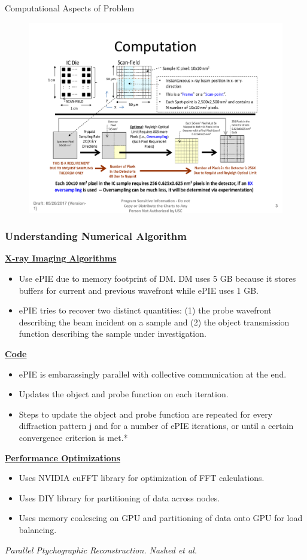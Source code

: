 \begin{frame}{Computational Aspects of Problem} 
\begin{figure}[ht!]
\includegraphics[scale=0.4]{./images/exp_schematic_1017_2}
\end{figure}
\end{frame}

\begin{frame}[label=AppUnderstanding]
\frametitle{Understanding Numerical Algorithm}
{\small \underline{\bf X-ray Imaging Algorithms}}
\begin{itemize}
\tiny \item \tiny Use ePIE due to memory footprint of DM. DM uses 5 GB because it stores buffers for current and previous wavefront while ePIE uses 1 GB.
\tiny \item \tiny ePIE tries to recover two distinct quantities: (1)
the probe wavefront describing the beam incident on a sample and (2) the object transmission function describing the sample under
investigation.
\end{itemize}
{\small \underline{\bf Code}}
\begin{itemize}
\item \tiny ePIE is embarassingly parallel with collective communication at the end.
\item \tiny Updates the object and probe function on each iteration.
\item \tiny Steps to update the object and probe function are repeated for every diffraction pattern j and for a number of ePIE iterations, or until a certain convergence criterion is met.*
\end{itemize}
{\small \underline{\bf Performance Optimizations}}
\begin{itemize}
\tiny \item \tiny Uses NVIDIA cuFFT library for optimization of FFT calculations.
\item \tiny Uses DIY library for partitioning of data across nodes.
\item \tiny Uses memory coalescing on GPU and partitioning of data onto GPU for load balancing.
\end{itemize}
{\tiny \textit{Parallel Ptychographic Reconstruction. Nashed et al.}}
\end{frame}

